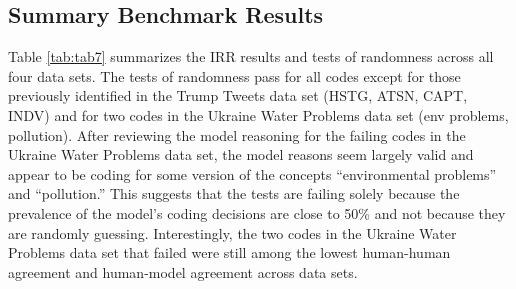\documentclass{article}
\begin{document}
\pagebreak
\subsection{Summary Benchmark Results}
\label{sec:summary}

Table \ref{tab:tab7} summarizes the IRR results and tests of randomness across all four data sets.  The tests of randomness pass for all codes except for those previously identified in the Trump Tweets data set (HSTG, ATSN, CAPT, INDV) and for two codes in the Ukraine Water Problems data set (env problems, pollution). After reviewing the model reasoning for the failing codes in the Ukraine Water Problems data set, the model reasons seem largely valid and appear to be coding for some version of the concepts “environmental problems” and “pollution.”  This suggests that the tests are failing solely because the prevalence of the model’s coding decisions are close to 50\% and not because they are randomly guessing.  Interestingly, the two codes in the Ukraine Water Problems data set that failed were still among the lowest human-human agreement and human-model agreement across data sets.







\end{document}
